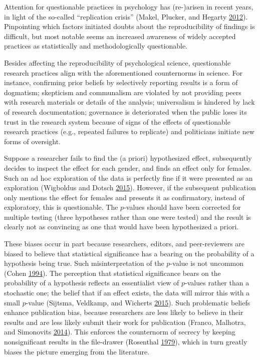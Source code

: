 \documentclass[a5paper]{book}
\begin{document}
Attention for questionable practices in psychology has (re-)arisen in
recent years, in light of the so-called \enquote{replication crisis}
(Makel, Plucker, and Hegarty
\protect\hyperlink{ref-doi:10.1177ux2f1745691612460688}{2012}).
Pinpointing which factors initiated doubts about the reproducibility of
findings is difficult, but most notable seems an increased awareness of
widely accepted practices as statistically and methodologically
questionable.

Besides affecting the reproducibility of psychological science,
questionable research practices align with the aforementioned
counternorms in science. For instance, confirming prior beliefs by
selectively reporting results is a form of dogmatism; skepticism and
communalism are violated by not providing peers with research materials
or details of the analysis; universalism is hindered by lack of research
documentation; governance is deteriorated when the public loses its
trust in the research system because of signs of the effects of
questionable research practices (e.g., repeated failures to replicate)
and politicians initiate new forms of oversight.

Suppose a researcher fails to find the (a priori) hypothesized effect,
subsequently decides to inspect the effect for each gender, and finds an
effect only for females. Such an ad hoc exploration of the data is
perfectly fine if it were presented as an exploration (Wigboldus and
Dotsch \protect\hyperlink{ref-doi:10.1007ux2fs11336-015-9445-1}{2015}).
However, if the subsequent publication only mentions the effect for
females and presents it as confirmatory, instead of exploratory, this is
questionable. The \(p\)-values should have been corrected for multiple
testing (three hypotheses rather than one were tested) and the result is
clearly not as convincing as one that would have been hypothesized a
priori.

These biases occur in part because researchers, editors, and
peer-reviewers are biased to believe that statistical significance has a
bearing on the probability of a hypothesis being true. Such
misinterpretation of the \(p\)-value is not uncommon (Cohen
\protect\hyperlink{ref-doi:10.1037ux2f0003-066X.49.12.997}{1994}). The
perception that statistical significance bears on the probability of a
hypothesis reflects an essentialist view of \(p\)-values rather than a
stochastic one; the belief that if an effect exists, the data will
mirror this with a small \(p\)-value (Sijtsma, Veldkamp, and Wicherts
\protect\hyperlink{ref-doi:10.1007ux2fs11336-015-9444-2}{2015}). Such
problematic beliefs enhance publication bias, because researchers are
less likely to believe in their results and are less likely submit their
work for publication (Franco, Malhotra, and Simonovits
\protect\hyperlink{ref-doi:10.1126ux2fscience.1255484}{2014}). This
enforces the counternorm of secrecy by keeping nonsignificant results in
the file-drawer (Rosenthal
\protect\hyperlink{ref-doi:10.1037ux2f0033-2909.86.3.638}{1979}), which
in turn greatly biases the picture emerging from the literature.
\end{document}
